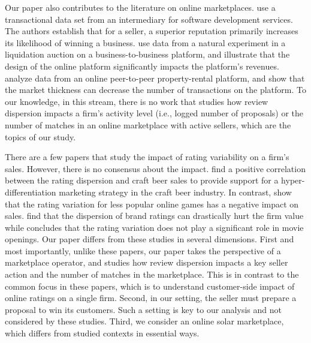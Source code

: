 \documentclass[msom,blindrev]{informs3}
\begin{document}
	
	Our paper also contributes to the literature on online marketplaces. \cite{moreno2014doing} use a transactional data set from an intermediary for software development services. The authors establish that for a seller,  a superior reputation primarily increases its likelihood of winning a business. \cite{bimpikis2019managing} use data from a natural experiment in a liquidation auction on a business-to-business platform, and illustrate that the design of the online platform significantly impacts the platform's revenues.  \cite{li2020higher} analyze data from an online peer-to-peer property-rental platform, and show that the market thickness can decrease the number of transactions on the platform. To our knowledge, in this stream, there is no work that studies how review dispersion impacts a firm's activity level (i.e., logged number of proposals) or the number of matches in an online marketplace with active sellers, which are the topics of our study.
	
	
	There are a few papers that study the impact of rating variability on a firm's sales. However, there is no consensus
	about the impact. \cite{clemons2006online} find a positive correlation between the rating dispersion and craft beer sales to provide support for a hyper-differentiation marketing strategy in the craft beer industry. In contrast, \cite{Zhu} show that the rating variation for less popular online games has a negative impact on sales. \cite{luo2013impact} find that the dispersion of brand ratings can drastically hurt the firm value while \cite{zhang2006tapping} concludes that the rating variation does not play a significant role in movie openings. Our paper differs from these studies in several dimensions. First and most importantly, unlike these papers, our paper takes the perspective of a marketplace operator, and studies how review dispersion impacts a key seller action and the number of matches in the marketplace. This is in contrast to the common focus in these papers, which is to understand customer-side impact of online ratings on a single firm. Second, in our setting, the seller must prepare a proposal to win its customers. Such a setting is key to our analysis and not considered by these studies. Third, we consider an online solar marketplace, which differs from studied contexts in essential ways.
	
\end{document}
